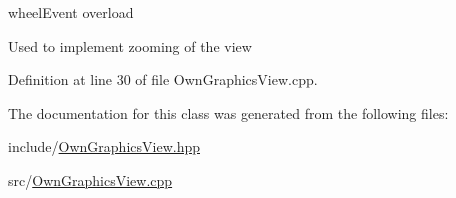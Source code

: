 wheel\+Event overload 

Used to implement zooming of the view 

Definition at line 30 of file Own\+Graphics\+View.\+cpp.



The documentation for this class was generated from the following files\+:\begin{DoxyCompactItemize}
\item 
include/\mbox{\hyperlink{OwnGraphicsView_8hpp}{Own\+Graphics\+View.\+hpp}}\item 
src/\mbox{\hyperlink{OwnGraphicsView_8cpp}{Own\+Graphics\+View.\+cpp}}\end{DoxyCompactItemize}
